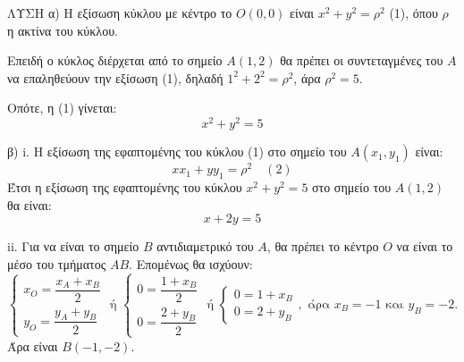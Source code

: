 \hfill \break
ΛΥΣΗ
\hfill \break
α) Η εξίσωση κύκλου με κέντρο το $Ο(0,0)$ είναι $x^2 + y^2 = \rho^2$ (1), όπου $\rho$ η ακτίνα του κύκλου.

Επειδή ο κύκλος διέρχεται από το σημείο $A(1,2)$ θα πρέπει οι συντεταγμένες του $A$ να επαληθεύουν την εξίσωση (1), δηλαδή $1^2 + 2^2 = \rho^2$, άρα $\rho^2 = 5$.

Οπότε, η (1) γίνεται:
\[ x^2 + y^2 = 5 \]

β)
i. Η εξίσωση της εφαπτομένης του κύκλου (1) στο σημείο του $A(x_1, y_1)$ είναι:
\[ xx_1 + yy_1 = \rho^2 \quad (2) \]
Έτσι η εξίσωση της εφαπτομένης του κύκλου $x^2 + y^2 = 5$ στο σημείο του $A(1,2)$ θα είναι:
\[ x + 2y = 5 \]

ii. Για να είναι το σημείο $B$ αντιδιαμετρικό του $A$, θα πρέπει το κέντρο $O$ να είναι το μέσο του τμήματος $AB$. Επομένως θα ισχύουν:
\[
\left\{
\begin{array}{l}
x_O = \dfrac{x_A + x_B}{2} \\
y_O = \dfrac{y_A + y_B}{2}
\end{array}
\right.
\text{ ή }
\left\{
\begin{array}{l}
0 = \dfrac{1 + x_B}{2} \\
0 = \dfrac{2 + y_B}{2}
\end{array}
\right.
\text{ ή }
\left\{
\begin{array}{l}
0 = 1 + x_B \\
0 = 2 + y_B
\end{array}
\right.
, \text{ άρα } x_B = -1 \text{ και } y_B = -2.
\]
Άρα είναι $B(-1,-2)$.
\hfill \break
\vspace{10pt}
\hfill \break